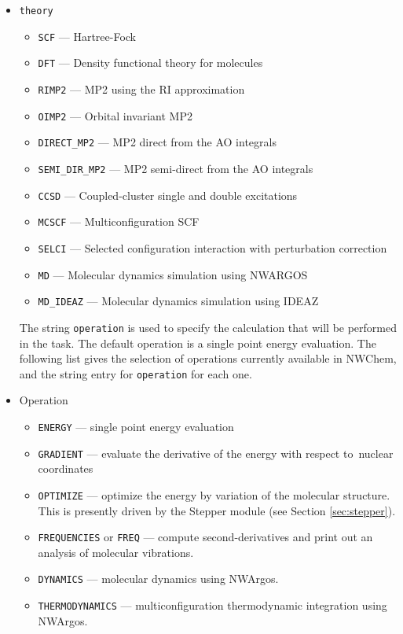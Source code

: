 \begin{itemize}
\item \verb+theory+ \newline
\begin{itemize}
 \item \verb+SCF+ --- Hartree-Fock
 \item \verb+DFT+ --- Density functional theory for molecules
 \item \verb+RIMP2+ --- MP2 using the RI approximation
 \item \verb+OIMP2+ --- Orbital invariant MP2
 \item \verb+DIRECT_MP2+ --- MP2 direct from the AO integrals
 \item \verb+SEMI_DIR_MP2+ --- MP2 semi-direct from the AO integrals
 \item \verb+CCSD+ --- Coupled-cluster single and double excitations
 \item \verb+MCSCF+ --- Multiconfiguration SCF
 \item \verb+SELCI+ --- Selected configuration interaction with perturbation
   correction 
 \item \verb+MD+ --- Molecular dynamics simulation using NWARGOS
 \item \verb+MD_IDEAZ+ --- Molecular dynamics simulation using IDEAZ
\end{itemize}

The string \verb+operation+ is used to specify the calculation that will
be performed in the task.  The default operation is a single point energy
evaluation.  The following list gives the selection of operations currently
available in NWChem, and the string entry for \verb+operation+ for each one.

\item Operation \newline
\begin{itemize}
 \item \verb+ENERGY+ --- single point energy evaluation
 \item \verb+GRADIENT+ --- evaluate the derivative of the energy with respect to\
   nuclear coordinates
 \item \verb+OPTIMIZE+ --- optimize the energy by variation of the molecular
   structure.  This is presently driven by the Stepper module
   (see Section \ref{sec:stepper}). 
 \item \verb+FREQUENCIES+ or \verb+FREQ+ --- compute second-derivatives and print
   out an analysis of molecular vibrations.
 \item \verb+DYNAMICS+ --- molecular dynamics using NWArgos.
 \item \verb+THERMODYNAMICS+ --- multiconfiguration thermodynamic integration
    using NWArgos.
\end{itemize} 
\end{itemize}

